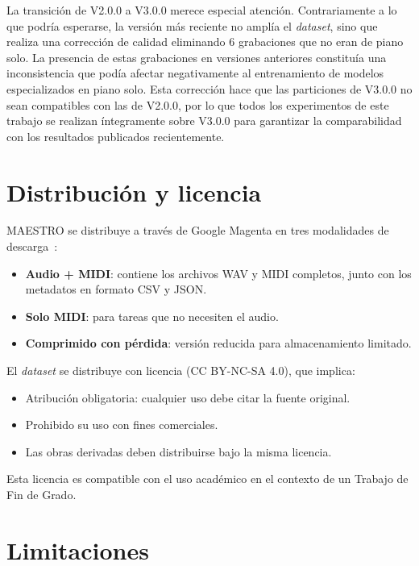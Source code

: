\documentclass[11pt,spanish,listoffigures,listoftables]{tfgetsinf}
\begin{document}
La transición de V2.0.0 a V3.0.0 merece especial atención. Contrariamente a lo que podría esperarse, la versión más reciente no amplía el \textit{dataset}, sino que realiza una corrección de 
calidad eliminando 6 grabaciones que no eran de piano solo. La presencia de estas grabaciones en versiones anteriores constituía una inconsistencia que podía afectar negativamente
al entrenamiento de modelos especializados en piano solo. Esta corrección hace que las particiones de V3.0.0 no sean compatibles con las de V2.0.0, por lo que todos los experimentos
de este trabajo se realizan íntegramente sobre V3.0.0 para garantizar la comparabilidad con los resultados publicados recientemente.

\section{Distribución y licencia}
\label{sec:maestro_distribucion}
MAESTRO se distribuye a través de Google Magenta en tres modalidades de descarga~\cite{magenta2020maestrov3}:
\begin{itemize}
\item  \textbf{Audio + MIDI}: contiene los archivos WAV y MIDI completos, junto con los metadatos en formato CSV y JSON.
\item \textbf{Solo MIDI}: para tareas que no necesiten el audio.
\item \textbf{Comprimido con pérdida}: versión reducida para almacenamiento limitado.
\end{itemize}

El \textit{dataset} se distribuye con licencia  (CC BY-NC-SA 4.0), que implica:
\begin{itemize}
\item  Atribución obligatoria: cualquier uso debe citar la fuente original.
\item Prohibido su uso con fines comerciales.
\item Las obras derivadas deben distribuirse bajo la misma licencia.
\end{itemize}

Esta licencia es compatible con el uso académico en el contexto de un Trabajo de Fin de Grado.

\section{Limitaciones}
\label{sec:maestro_limitaciones}
\end{document}
